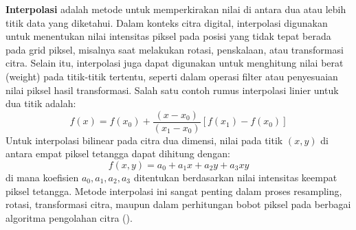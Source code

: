   \textbf{Interpolasi} adalah metode untuk memperkirakan nilai di antara dua atau lebih titik data yang diketahui. Dalam konteks citra digital, interpolasi digunakan untuk menentukan nilai intensitas piksel pada posisi yang tidak tepat berada pada grid piksel, misalnya saat melakukan rotasi, penskalaan, atau transformasi citra. Selain itu, interpolasi juga dapat digunakan untuk menghitung nilai berat (weight) pada titik-titik tertentu, seperti dalam operasi filter atau penyesuaian nilai piksel hasil transformasi. Salah satu contoh rumus interpolasi linier untuk dua titik adalah:
\begin{equation}
  f(x) = f(x_0) + \frac{(x - x_0)}{(x_1 - x_0)} \left[ f(x_1) - f(x_0) \right]
  \label{eq:interpolasi-linier}
\end{equation}
  Untuk interpolasi bilinear pada citra dua dimensi, nilai pada titik \((x, y)\) di antara empat piksel tetangga dapat dihitung dengan:
\begin{equation*}
  f(x, y) = a_0 + a_1x + a_2y + a_3xy
  \label{eq:interpolasi-bilinear}
\end{equation*}
  di mana koefisien \(a_0, a_1, a_2, a_3\) ditentukan berdasarkan nilai intensitas keempat piksel tetangga. Metode interpolasi ini sangat penting dalam proses resampling, rotasi, transformasi citra, maupun dalam perhitungan bobot piksel pada berbagai algoritma pengolahan citra (\cite[hlm. 89--91]{Gonzalez2018}).





